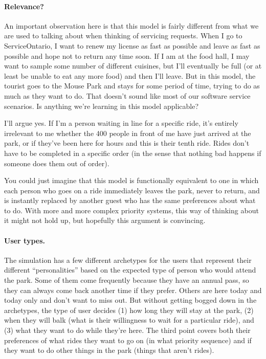 \paragraph{Relevance?}
An important observation here is that this model is fairly different from what we are used to talking about when thinking of servicing requests. When I go to ServiceOntario, I want to renew my license as fast as possible and leave as fast as possible and hope not to return any time soon. If I am at the food hall, I may want to sample some number of different cuisines, but I'll eventually be full (or at least be unable to eat any more food) and then I'll leave. But in this model, the tourist goes to the Mouse Park and stays for some period of time, trying to do as much as they want to do. That doesn't sound like most of our software service scenarios. Is anything we're learning in this model applicable?

I'll argue yes. If I'm a person waiting in line for a specific ride, it's entirely irrelevant to me whether the 400 people in front of me have just arrived at the park, or if they've been here for hours and this is their tenth ride. Rides don't have to be completed in a specific order (in the sense that nothing bad happens if someone does them out of order).

You could just imagine that this model is functionally equivalent to one in which each person who goes on a ride immediately leaves the park, never to return, and is instantly replaced by another guest who has the same preferences about what to do. With more and more complex priority systems, this way of thinking about it might not hold up, but hopefully this argument is convincing.

\paragraph{User types.}
The simulation has a few different archetypes for the users that represent their different ``personalities'' based on the expected type of person who would attend the park. Some of them come frequently because they have an annual pass, so they can always come back another time if they prefer. Others are here today and today only and don't want to miss out. But without getting bogged down in the archetypes, the type of user decides (1) how long they will stay at the park, (2) when they will balk (what is their willingness to wait for a particular ride), and (3) what they want to do while they're here. The third point covers both their preferences of what rides they want to go on (in what priority sequence) and if they want to do other things in the park (things that aren't rides).


